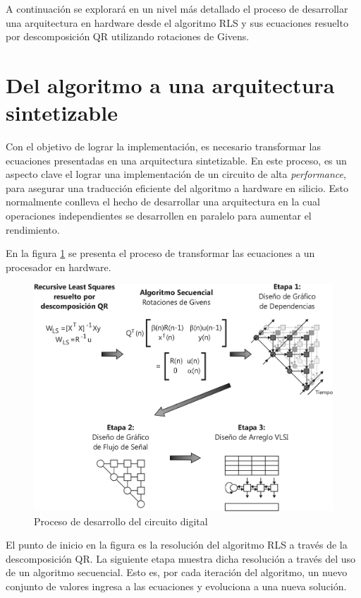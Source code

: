 A continuación se explorará en un nivel más detallado el proceso de desarrollar una arquitectura en hardware desde el algoritmo RLS y sus ecuaciones resuelto por descomposición QR utilizando rotaciones de Givens.

\section{Del algoritmo a una arquitectura sintetizable}

Con el objetivo de lograr la implementación, es necesario transformar las ecuaciones presentadas en una arquitectura sintetizable. En este proceso, es un aspecto clave el lograr una implementación de un circuito de alta \textit{performance}, para asegurar una traducción eficiente del algoritmo a hardware en silicio. Esto normalmente conlleva el hecho de desarrollar una arquitectura en la cual operaciones independientes se desarrollen en paralelo para aumentar el rendimiento.

En la figura \ref{fig:development_process} se presenta el proceso de transformar las ecuaciones a un procesador en hardware.

\begin{figure}[h!]
        \centering
        \includegraphics[width=14cm]{./figures/C03-development_process}
        \caption{Proceso de desarrollo del circuito digital}
        \label{fig:development_process}
\end{figure}

El punto de inicio en la figura es la resolución del algoritmo RLS a través de la descomposición QR. La siguiente etapa muestra dicha resolución a través del uso de un algoritmo secuencial. Esto es, por cada iteración del algoritmo, un nuevo conjunto de valores ingresa a las ecuaciones y evoluciona a una nueva solución.

